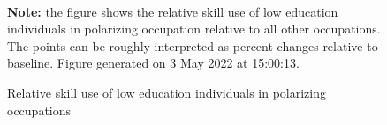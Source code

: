 \begin{figure}[!h]
\centering
\caption{Relative skill use of low education individuals in polarizing occupations}
\label{fig:relative_use}
  \\ 
\par \begin{minipage}[h]{\textwidth}{\scriptsize\textbf{Note:} the figure shows the relative skill use of low education individuals in polarizing occupation relative to all other occupations. The points can be roughly interpreted as percent changes relative to baseline. Figure generated on  3 May 2022 at 15:00:13.}\end{minipage}
\end{figure}
